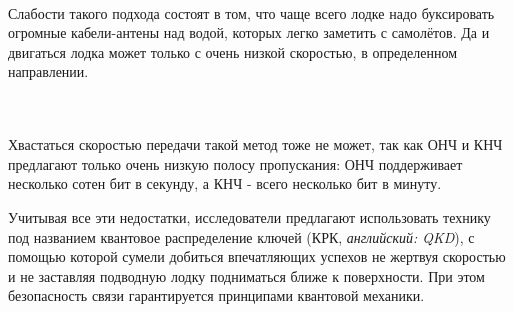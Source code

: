\documentclass[a4paper,12pt]{article} %
\begin{document}
\noindent%
\begin{minipage}{\linewidth}%
\label{SVM}%
\end{minipage}

~\\

Слабости такого подхода состоят в том, что чаще всего лодке надо буксировать огромные кабели-антены над водой, которых легко заметить с самолётов. Да и двигаться лодка может только с очень низкой скоростью, в определенном направлении.
~\\~

\noindent%
\begin{minipage}{\linewidth}%
\label{SVM}%
\end{minipage}

~\\

Хвастаться скоростью передачи такой метод тоже не может, так как ОНЧ и КНЧ предлагают только очень низкую полосу пропускания: ОНЧ поддерживает несколько сотен бит в секунду, а КНЧ - всего несколько бит в минуту.

Учитывая все эти недостатки, исследователи предлагают использовать технику под названием квантовое распределение ключей (КРК, {\it английский: QKD}), с помощью которой сумели добиться впечатляющих успехов не жертвуя скоростью и не заставляя подводную лодку подниматься ближе к поверхности. При этом безопасность связи гарантируется принципами квантовой механики. 
\end{document}
